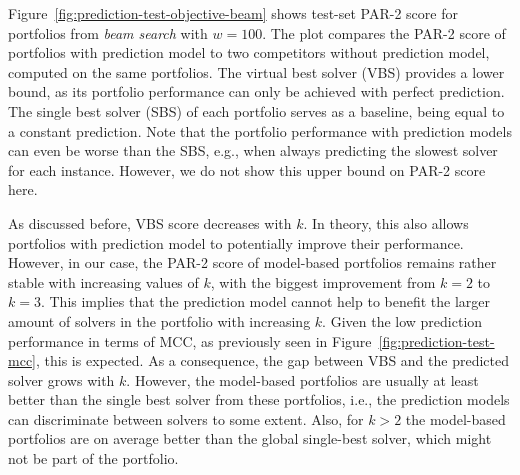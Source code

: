 \documentclass[conference]{IEEEtran}
\begin{document}
Figure~\ref{fig:prediction-test-objective-beam} shows test-set PAR-2 score for portfolios from \emph{beam search} with $w=100$.
The plot compares the PAR-2 score of portfolios with prediction model to two competitors without prediction model, computed on the same portfolios.
The virtual best solver (VBS) provides a lower bound, as its portfolio performance can only be achieved with perfect prediction.
The single best solver (SBS) of each portfolio serves as a baseline, being equal to a constant prediction.
Note that the portfolio performance with prediction models can even be worse than the SBS, e.g., when always predicting the slowest solver for each instance.
However, we do not show this upper bound on PAR-2 score here.

As discussed before, VBS score decreases with $k$.
In theory, this also allows portfolios with prediction model to potentially improve their performance.
However, in our case, the PAR-2 score of model-based portfolios remains rather stable with increasing values of $k$, with the biggest improvement from $k=2$ to $k=3$.
This implies that the prediction model cannot help to benefit the larger amount of solvers in the portfolio with increasing $k$.
Given the low prediction performance in terms of MCC, as previously seen in Figure~\ref{fig:prediction-test-mcc}, this is expected.
As a consequence, the gap between VBS and the predicted solver grows with $k$.
However, the model-based portfolios are usually at least better than the single best solver from these portfolios, i.e., the prediction models can discriminate between solvers to some extent.
Also, for $k > 2$ the model-based portfolios are on average better than the global single-best solver, which might not be part of the portfolio.
\end{document}
